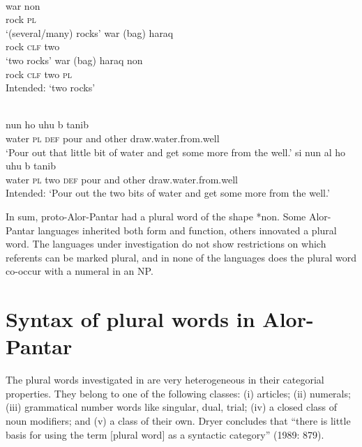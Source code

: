 \ea%
\label{ex:9:10}
 \\
\ea
\gll  war non\\
   rock \textsc{pl}  \\
\glt `(several/many) rocks'
\ex
\gll war (bag) {haraq}\\
 rock \textsc{clf} two  \\
\glt   `two rocks'
\ex
\gll *war (bag) haraq non \\
 rock \textsc{clf} two \textsc{pl} \\
 \glt Intended: `two rocks'
\z
\z



\ea%
\label{ex:9:11}
 \\
\ea
{} nun ho {\textglotstop}uhu{\textltailn} {\textepsilon}  b{\textepsilon}{\ng} tanib \\
   water \textsc{pl} \textsc{def} pour and other draw.water.from.well  \\
\glt `Pour out that little bit of water and get some more from the well.'
\ex
\gll *s{\textepsilon}{i} nun al{\textopeno} ho {\textglotstop}uhu{\textltailn} {\textepsilon} b{\textepsilon}{\ng} tanib \\
   water \textsc{pl} two \textsc{def} pour and other draw.water.from.well  \\
\glt  Intended: `Pour out the two bits of water and get some more from the well.'
\z
\z

In sum, proto-Alor-Pantar had a plural word of the shape *non. Some Alor-Pantar languages inherited both form and function, others innovated a plural word. The languages under investigation do not show restrictions on which referents can be marked plural, and in none of the languages does the plural word co-occur with a numeral in an NP.

\section{Syntax of plural words in Alor-Pantar}  %

\label{sec:9:3}
The plural words investigated in \citet{Dryer1989} are very heterogeneous in their categorial properties. They belong to one of the following classes: (i) articles; (ii) numerals; (iii) grammatical number words like singular, dual, trial; (iv) a closed class of noun modifiers; and (v) a class of their own. Dryer concludes that ``there is little basis for using the term [plural word] as a syntactic category'' (1989: 879).

